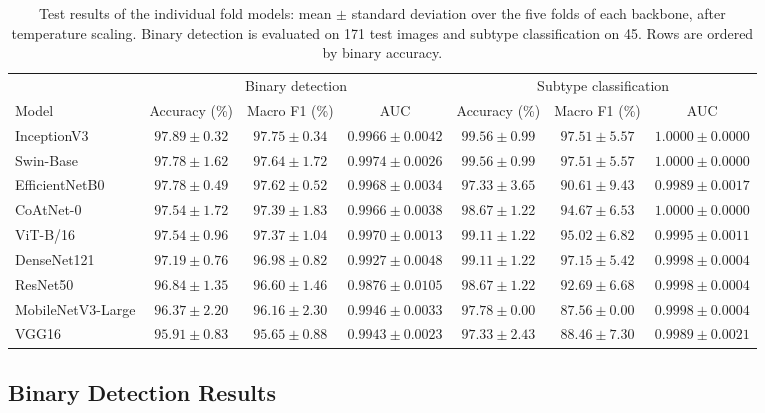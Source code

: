 \documentclass[final,3p,times,number]{elsarticle}
\begin{document}
\begin{table}[htbp]
\centering
\caption{Test results of the individual fold models: mean $\pm$ standard deviation over the five folds of each backbone, after temperature scaling. Binary detection is evaluated on 171 test images and subtype classification on 45. Rows are ordered by binary accuracy.}
\label{tab:cv}
\small
\begin{tabular*}{\textwidth}{@{\extracolsep{\fill}}lcccccc@{}}
\toprule
 & \multicolumn{3}{c}{Binary detection} & \multicolumn{3}{c}{Subtype classification} \\
\cmidrule(lr){2-4}\cmidrule(l){5-7}
Model & Accuracy (\%) & Macro F1 (\%) & AUC & Accuracy (\%) & Macro F1 (\%) & AUC \\
\midrule
InceptionV3 & $97.89\pm 0.32$ & $97.75\pm 0.34$ & $0.9966\pm 0.0042$ & $99.56\pm 0.99$ & $97.51\pm 5.57$ & $1.0000\pm 0.0000$ \\
Swin-Base & $97.78\pm 1.62$ & $97.64\pm 1.72$ & $0.9974\pm 0.0026$ & $99.56\pm 0.99$ & $97.51\pm 5.57$ & $1.0000\pm 0.0000$ \\
EfficientNetB0 & $97.78\pm 0.49$ & $97.62\pm 0.52$ & $0.9968\pm 0.0034$ & $97.33\pm 3.65$ & $90.61\pm 9.43$ & $0.9989\pm 0.0017$ \\
CoAtNet-0 & $97.54\pm 1.72$ & $97.39\pm 1.83$ & $0.9966\pm 0.0038$ & $98.67\pm 1.22$ & $94.67\pm 6.53$ & $1.0000\pm 0.0000$ \\
ViT-B/16 & $97.54\pm 0.96$ & $97.37\pm 1.04$ & $0.9970\pm 0.0013$ & $99.11\pm 1.22$ & $95.02\pm 6.82$ & $0.9995\pm 0.0011$ \\
DenseNet121 & $97.19\pm 0.76$ & $96.98\pm 0.82$ & $0.9927\pm 0.0048$ & $99.11\pm 1.22$ & $97.15\pm 5.42$ & $0.9998\pm 0.0004$ \\
ResNet50 & $96.84\pm 1.35$ & $96.60\pm 1.46$ & $0.9876\pm 0.0105$ & $98.67\pm 1.22$ & $92.69\pm 6.68$ & $0.9998\pm 0.0004$ \\
MobileNetV3-Large & $96.37\pm 2.20$ & $96.16\pm 2.30$ & $0.9946\pm 0.0033$ & $97.78\pm 0.00$ & $87.56\pm 0.00$ & $0.9998\pm 0.0004$ \\
VGG16 & $95.91\pm 0.83$ & $95.65\pm 0.88$ & $0.9943\pm 0.0023$ & $97.33\pm 2.43$ & $88.46\pm 7.30$ & $0.9989\pm 0.0021$ \\
\bottomrule
\end{tabular*}
\end{table}

\subsection{Binary Detection Results}
\label{sec:binary-results}
\end{document}
